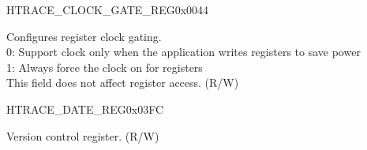 \begin{register}{H}{TRACE\_CLOCK\_GATE\_REG}{0x0044}\label{regdesc:TRACECLOCKGATEREG}
%
%
\regnewline%
\begin{regdesc}\begin{reglist}
\label{fielddesc:TRACECLKEN}\item [TRACE\_CLK\_EN] Configures register clock gating.\\0: Support clock only when the application writes registers to save power\\1: Always force the clock on for registers\\This field does not affect register access. (R/W)
\end{reglist}\end{regdesc}
\end{register}


\begin{register}{H}{TRACE\_DATE\_REG}{0x03FC}\label{regdesc:TRACEDATEREG}
%
%
\regnewline%
\begin{regdesc}\begin{reglist}
\label{fielddesc:TRACEDATE}\item [TRACE\_DATE] Version control register. (R/W)
\end{reglist}\end{regdesc}
\end{register}


